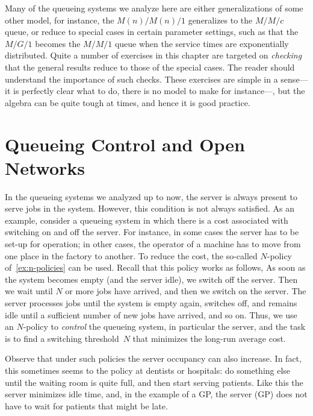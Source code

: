 Many of the queueing systems we analyze here are either generalizations of some other model, for instance, the $M(n)/M(n)/1$ generalizes to the $M/M/c$ queue, or reduce to special cases in certain parameter settings, such as that the $M/G/1$ becomes the $M/M/1$ queue when the service times are exponentially distributed.
Quite a number of exercises in this chapter are targeted on \emph{checking} that the general results reduce to those of the special cases.
The reader should understand the importance of such checks.
These exercises are simple in a sense---it is perfectly clear what to do, there is no model to make for instance---, but the algebra can be quite tough at times, and hence it is good practice.







% 
%


\chapter{Queueing Control and Open Networks}
\label{cha:queu-contr-open}

In the queueing systems we analyzed up to now, the server is always present to serve jobs in the system. However, this condition is not always satisfied.
As an example, consider a queueing system in which there is a cost associated with switching on and off the server.
For instance, in some cases the server has to be set-up for operation; in other cases, the operator of a machine has to move from one place in the factory to another.
To reduce the cost, the  so-called $N$-policy of~\cref{ex:n-policies} can be used. Recall that this policy works as follows, 
As soon as the system becomes empty (and the server idle), we switch off the server.
Then we wait until $N$ or more jobs have arrived, and then we switch on the server.
The server processes jobs until the system is empty again, switches off, and remains idle until a sufficient number of new jobs have arrived,  and so on.
Thus, we use an $N$-policy to \emph{control} the queueing system, in particular the server, and the task is to find a switching threshold~$N$ that minimizes the long-run average cost.

Observe that under such policies the server occupancy can also increase.
In fact, this sometimes seems to the policy at dentists or hospitals: do something else until the waiting room is quite full, and then start serving patients.
Like this the server minimizes idle time, and, in the example of a GP, the server (GP) does not have to wait for patients that might be late.

